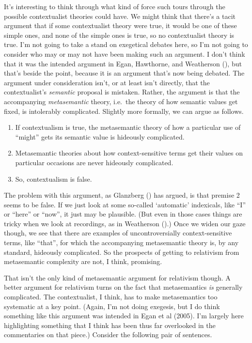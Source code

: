 \documentclass[
  11pt,
  letterpaper,
  DIV=11,
  numbers=noendperiod,
  twoside]{scrartcl}
\providecommand{\tightlist}{%
  \setlength{\itemsep}{0pt}\setlength{\parskip}{0pt}}
\begin{document}
It's interesting to think through what kind of force such tours through
the possible contextualist theories could have. We might think that
there's a tacit argument that if some contextualist theory were true, it
would be one of these simple ones, and none of the simple ones is true,
so no contextualist theory is true. I'm not going to take a stand on
exegetical debates here, so I'm not going to consider who may or may not
have been making such an argument. I don't think that it was the
intended argument in Egan, Hawthorne, and Weatherson
(), but that's beside the point,
because it is an argument that's now being debated. The argument under
consideration isn't, or at least isn't directly, that the
contextualist's \emph{semantic} proposal is mistaken. Rather, the
argument is that the accompanying \emph{metasemantic} theory, i.e.~the
theory of how semantic values get fixed, is intolerably complicated.
Slightly more formally, we can argue as follows.

\begin{enumerate}
\def\labelenumi{\arabic{enumi}.}
\tightlist
\item
  If contextualism is true, the metasemantic theory of how a particular
  use of ``might'' gets its semantic value is hideously complicated.
\item
  Metasemantic theories about how context-sensitive terms get their
  values on particular occasions are never hideously complicated.
\item
  So, contextualism is false.
\end{enumerate}

The problem with this argument, as Glanzberg
() has argued, is that premise 2 seems
to be false. If we just look at some so-called `automatic' indexicals,
like ``I'' or ``here'' or ``now'', it just may be plausible. (But even
in those cases things are tricky when we look at recordings, as in
Weatherson ().) Once we widen
our gaze though, we see that there are examples of uncontroversially
context-sensitive terms, like ``that'', for which the accompanying
metasemantic theory is, by any standard, hideously complicated. So the
prospects of getting to relativism from metasemantic complexity are not,
I think, promising.

That isn't the only kind of metasemantic argument for relativism though.
A better argument for relativism turns on the fact that metasemantics
\emph{is} generally complicated. The contextualist, I think, has to make
metasemantics too systematic at a key point. (Again, I'm not doing
exegesis, but I do think something like this argument was intended in
Egan et al (2005). I'm largely here highlighting something that I think
has been thus far overlooked in the commentaries on that piece.)
Consider the following pair of sentences.
\end{document}
